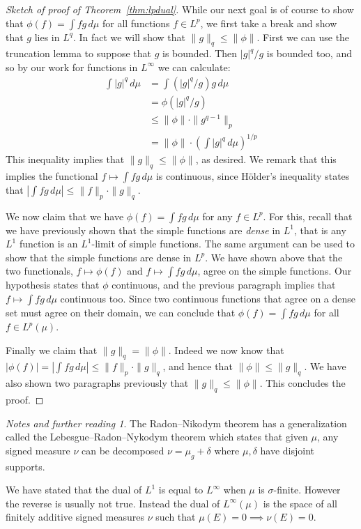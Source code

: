 \documentclass[11pt,oneside]{amsbook}
\theoremstyle{definition}
\theoremstyle{plain}
\theoremstyle{definition}
\theoremstyle{remark}
\newtheorem*{notes}{Notes and further reading}
\numberwithin{equation}{section}
\numberwithin{figure}{section}
\begin{document}
\begin{proof}[Sketch of proof of Theorem~\ref{thm:lpdual}]
  While our next goal is of course to show that $\phi(f)=\int fg\,d\mu$ for all functions $f\in L^p$, we first take a break and show that $g$ lies in $L^q$. In fact we will show that $\|g\|_q\leq\|\phi\|$. First we can use the truncation lemma to suppose that $g$ is bounded. Then $|g|^q/g$ is bounded too, and so by our work for functions in $L^\infty$ we can calculate:
  \begin{align*}
    \int|g|^q\,d\mu&=\int(|g|^q/g)g\,d\mu\\
                   &=\phi(|g|^q/g)\\
                   &\leq\|\phi\|\cdot\|g^{q-1}\|_p\\
                   &=\|\phi\|\cdot\left(\int|g|^q\,d\mu\right)^{1/p}
  \end{align*}
  This inequality implies that $\|g\|_q\leq\|\phi\|$, as desired. We remark that this implies the functional $f\mapsto\int fg\,d\mu$ is continuous, since H\"older's inequality states that $\left|\int fg\,d\mu\right|\leq\|f\|_p\cdot\|g\|_q$.

  We now claim that we have $\phi(f)=\int fg\,d\mu$ for any $f\in L^p$. For this, recall that we have previously shown that the simple functions are \emph{dense} in $L^1$, that is any $L^1$ function is an $L^1$-limit of simple functions. The same argument can be used to show that the simple functions are dense in $L^p$. We have shown above that the two functionals, $f\mapsto\phi(f)$ and $f\mapsto\int fg\,d\mu$, agree on the simple functions. Our hypothesis states that $\phi$ continuous, and the previous paragraph implies that $f\mapsto\int fg\,d\mu$ continuous too. Since two continuous functions that agree on a dense set must agree on their domain, we can conclude that $\phi(f)=\int fg\,d\mu$ for all $f\in L^p(\mu)$.

  Finally we claim that $\|g\|_q=\|\phi\|$. Indeed we now know that $|\phi(f)|=\left|\int fg\,d\mu\right|\leq\|f\|_p\cdot\|g\|_q$, and hence that $\|\phi\|\leq\|g\|_q$. We have also shown two paragraphs previously that $\|g\|_q\leq\|\phi\|$. This concludes the proof.
\end{proof}

\begin{notes}
  The Radon--Nikodym theorem has a generalization called the Lebesgue--Radon--Nykodym theorem which states that given $\mu$, any signed measure $\nu$ can be decomposed $\nu=\mu_g+\delta$ where $\mu,\delta$ have disjoint supports.

  We have stated that the dual of $L^1$ is equal to $L^\infty$ when $\mu$ is $\sigma$-finite. However the reverse is usually not true. Instead the dual of $L^\infty(\mu)$ is the space of all finitely additive signed measures $\nu$ such that $\mu(E)=0\implies\nu(E)=0$.
\end{notes}
\end{document}
